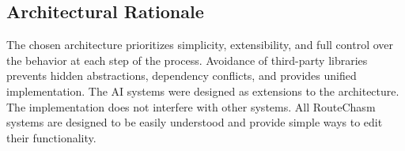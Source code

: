 \subsection{Architectural Rationale}\label{subsec:architecture-architectural_rationale}
The chosen architecture prioritizes simplicity, extensibility, and full control over the behavior at each step of the process.
Avoidance of third-party libraries prevents hidden abstractions, dependency conflicts, and provides unified implementation.
The AI systems were designed as extensions to the architecture.
The implementation does not interfere with other systems.
All RouteChasm systems are designed to be easily understood and provide simple ways to edit their functionality.